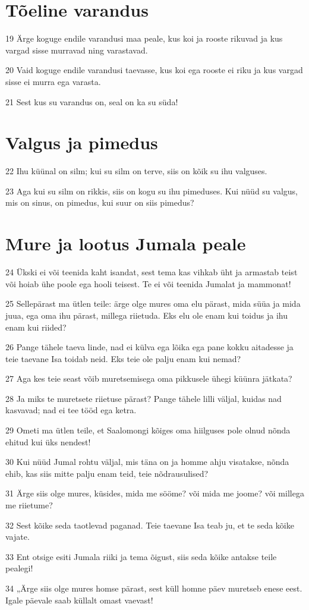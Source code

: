 \section*{Tõeline varandus}

\par 19 Ärge koguge endile varandusi maa peale, kus koi ja rooste rikuvad ja kus vargad sisse murravad ning varastavad.
\par 20 Vaid koguge endile varandusi taevasse, kus koi ega rooste ei riku ja kus vargad sisse ei murra ega varasta.
\par 21 Sest kus su varandus on, seal on ka su süda!

\section*{Valgus ja pimedus}

\par 22 Ihu küünal on silm; kui su silm on terve, siis on kõik su ihu valguses.
\par 23 Aga kui su silm on rikkis, siis on kogu su ihu pimeduses. Kui nüüd su valgus, mis on sinus, on pimedus, kui suur on siis pimedus?

\section*{Mure ja lootus Jumala peale}

\par 24 Ükski ei või teenida kaht isandat, sest tema kas vihkab üht ja armastab teist või hoiab ühe poole ega hooli teisest. Te ei või teenida Jumalat ja mammonat!
\par 25 Sellepärast ma ütlen teile: ärge olge mures oma elu pärast, mida süüa ja mida juua, ega oma ihu pärast, millega riietuda. Eks elu ole enam kui toidus ja ihu enam kui riided?
\par 26 Pange tähele taeva linde, nad ei külva ega lõika ega pane kokku aitadesse ja teie taevane Isa toidab neid. Eks teie ole palju enam kui nemad?
\par 27 Aga kes teie seast võib muretsemisega oma pikkusele ühegi küünra jätkata?
\par 28 Ja miks te muretsete riietuse pärast? Pange tähele lilli väljal, kuidas nad kasvavad; nad ei tee tööd ega ketra.
\par 29 Ometi ma ütlen teile, et Saalomongi kõiges oma hiilguses pole olnud nõnda ehitud kui üks nendest!
\par 30 Kui nüüd Jumal rohtu väljal, mis täna on ja homme ahju visatakse, nõnda ehib, kas siis mitte palju enam teid, teie nõdrausulised?
\par 31 Ärge siis olge mures, küsides, mida me sööme? või mida me joome? või millega me riietume?
\par 32 Sest kõike seda taotlevad paganad. Teie taevane Isa teab ju, et te seda kõike vajate.
\par 33 Ent otsige esiti Jumala riiki ja tema õigust, siis seda kõike antakse teile pealegi!
\par 34 „Ärge siis olge mures homse pärast, sest küll homne päev muretseb enese eest. Igale päevale saab küllalt omast vaevast!


